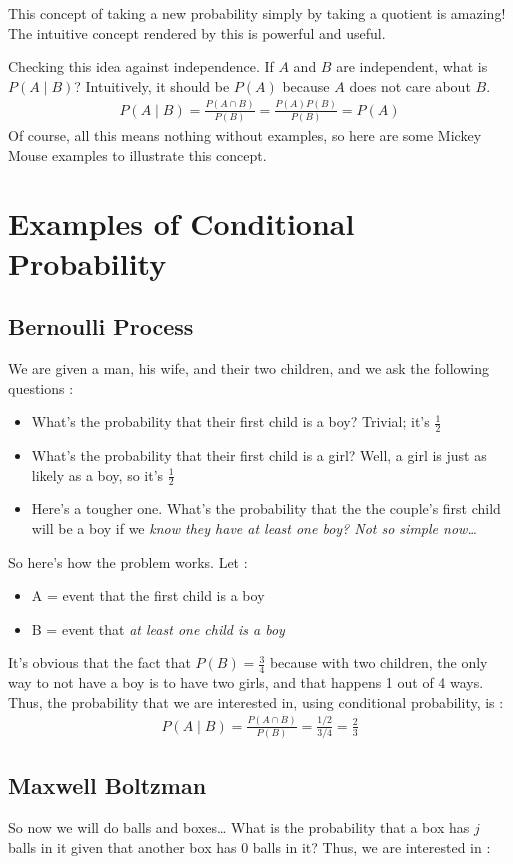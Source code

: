 This concept of taking a new probability simply by taking a quotient
is amazing!  The intuitive concept rendered by this is powerful and useful.  

Checking this idea against independence.  If $A$ and $B$ are independent, what is $P(A \mid B)$?  Intuitively, it should be $P(A)$ because $A$ does not care about $B$.
\begin{eqnarray*}
P(A \mid B) = \frac{P(A \cap B)}{P(B)} = \frac{P(A)P(B)}{P(B)} = P(A)
\end{eqnarray*}
Of course, all this means nothing without examples, so here are some Mickey Mouse examples to illustrate this concept.

\section{Examples of Conditional Probability}
\subsection{Bernoulli Process}
We are given a man, his wife, and their two children, and we ask the following questions : 
\begin{itemize}
\item What's the probability that their first child is a boy?  Trivial; it's $\frac{1}{2}$
\item What's the probability that their first child is a girl?  Well, a girl is just as likely as a boy, so it's $\frac{1}{2}$
\item Here's a tougher one.  What's the probability that the the couple's first child will be a boy if we \em know \em they have at least one boy?  Not so simple now\ldots
\end{itemize}
So here's how the problem works.  Let :
\begin{itemize}
\item[] A = event that the first child is a boy
\item[] B = event that \em at least \em one child is a boy
\end{itemize}
It's obvious that the fact that $P(B) = \frac{3}{4}$ because with two children, the only way to not have a boy is to have two girls, and that happens 1 out of 4 ways.
Thus, the probability that we are interested in, using conditional probability, is : 
\begin{eqnarray*}
P(A \mid B) = \frac{P(A \cap B)}{P(B)} = \frac{1/2}{3/4} = \frac{2}{3}
\end{eqnarray*}
\subsection{Maxwell Boltzman}
So now we will do balls and boxes\ldots
What is the probability that a box has $j$ balls in it given that another box has 0 balls in it?  Thus, we are interested in : 

